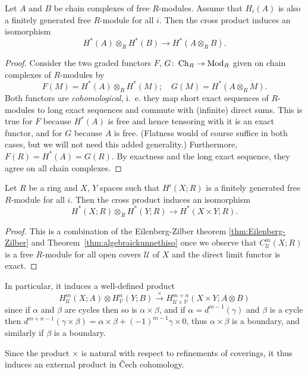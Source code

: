 \documentclass[a4paper,openany]{scrbook}
\begin{document}
\begin{thm}\label{thm:algebraickunnethiso}
Let $A$ and $B$ be chain complexes of free $R$-modules. Assume that $H_i(A)$ is also a finitely generated free $R$-module for all $i$. Then the cross product induces an isomorphism
\[
H^*(A) \otimes_R H^*(B) \to H^*(A \otimes_R B).
\]
\end{thm}
\begin{proof}
Consider the two graded functors $F$, $G\colon \operatorname{Ch}_R \to \operatorname{Mod}_R$ given on chain complexes of $R$-modules by
\[
F(M) = H^*(A) \otimes_R H^*(M); \quad G(M) = H^*(A \otimes_R M).
\]
Both functors are \emph{cohomological}, i.~e. they map short exact sequences of $R$-modules to long exact sequences and commute with (infinite) direct sums. This is true for $F$ because $H^*(A)$ is free and hence tensoring with it is an exact functor, and for $G$ because $A$ is free. (Flatness would of course suffice in both cases, but we will not need this added generality.) Furthermore, $F(R) = H^*(A) = G(R)$. By exactness and the long exact sequence, they agree on all chain complexes.
\end{proof}

\begin{corollary}\label{cor:kunneth}
Let $R$ be a ring and $X$, $Y$ spaces such that $H^i(X;R)$ is a finitely generated free $R$-module for all $i$. Then the cross product induces an isomorphism
\[
H^*(X;R) \otimes_R H^*(Y;R) \to H^*(X \times Y;R).
\]
\end{corollary}
\begin{proof}
This is a combination of the Eilenberg-Zilber theorem \eqref{thm:Eilenberg-Zilber} and Theorem~\ref{thm:algebraickunnethiso} once we observe that $C^m_{\mathcal U}(X;R)$ is a free $R$-module for all open covers $\mathcal U$ of $X$ and the direct limit functor is exact.
\end{proof}

In particular, it induces a well-defined product
\[
H^m_{\mathcal U}(X;A) \otimes H^n_{\mathcal V}(Y;B) \xrightarrow{\times} H^{m+n}_{\mathcal U \times \mathcal V}(X\times Y;A \otimes B)
\]
since if $\alpha$ and $\beta$ are cycles then so is $\alpha \times \beta$, and if $\alpha=d^{m-1}(\gamma)$ and $\beta$ is a cycle then $d^{m+n-1}(\gamma \times \beta) = \alpha \times \beta + (-1)^{m-1}\gamma \times 0$, thus $\alpha \times \beta$ is a boundary, and similarly if $\beta$ is a boundary.

Since the product $\times$ is natural with respect to refinements of coverings, it thus induces an external product in \v Cech cohomology.
\end{document}
